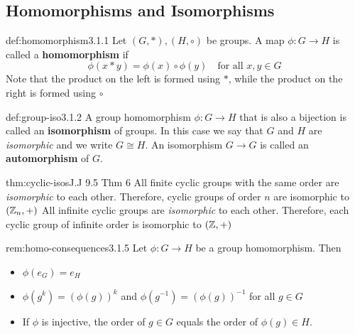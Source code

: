 \documentclass[landscape, 8pt]{extarticle}
\begin{document}
\begin{multicols}{3}
\subsection*{Homomorphisms and Isomorphisms}
\begin{dfn}{def:homomorphism}{3.1.1}
    Let $(G,*),(H,\circ)$ be groups. A map $\phi:G\to H$ is called a \textbf{homomorphism} if
    $$\phi(x*y)=\phi(x)\circ\phi(y)\quad \text{for all } x,y\in G$$
    Note that the product on the left is formed using $\ast$, while the product on the right is formed using $\circ$
\end{dfn}
\vspace{-5pt}

\begin{dfn}{def:group-iso}{3.1.2}
    A group homomorphism $\phi:G\to H$ that is also a bijection is called an \textbf{isomorphism} of groups. In this case we say that $G$ and $H$ are \textit{isomorphic} and we write $G\cong H$. 
    An isomorphism $G\to G$ is called an \textbf{automorphism} of $G$.
\end{dfn}
\vspace{-5pt}

\begin{thm}{thm:cyclic-isos}{J.J 9.5 Thm 6}
All finite cyclic groups with the same order are \textit{isomorphic} to each other. Therefore, cyclic groups of order $n$ are isomorphic to $(\mathbb{Z}_{n}, +)$
\vspace{0pt}\newline
All infinite cyclic groups are \textit{isomorphic} to each other. Therefore, each cyclic group of infinite order is isomorphic to $(\mathbb{Z}, +)$
\end{thm}
\vspace{-5pt}



\begin{rem}{rem:homo-consequences}{3.1.5}
Let $\phi:G\to H$ be a group homomorphism. Then
\renewcommand\labelitemi{\tiny$\bullet$}
\begin{itemize}
    \setlength\itemsep{0em}
    \item $\phi(e_{G})=e_{H}$
    \item $\phi(g^k)=(\phi(g))^{k}$ and $\phi(g^{-1})=(\phi(g))^{-1}$ for all $g\in G$
    \item If $\phi$ is injective, the order of $g\in G$ equals the order of $\phi(g)\in H$.
\end{itemize}
\end{rem}
\vspace{-5pt}


\end{multicols}
\end{document}
